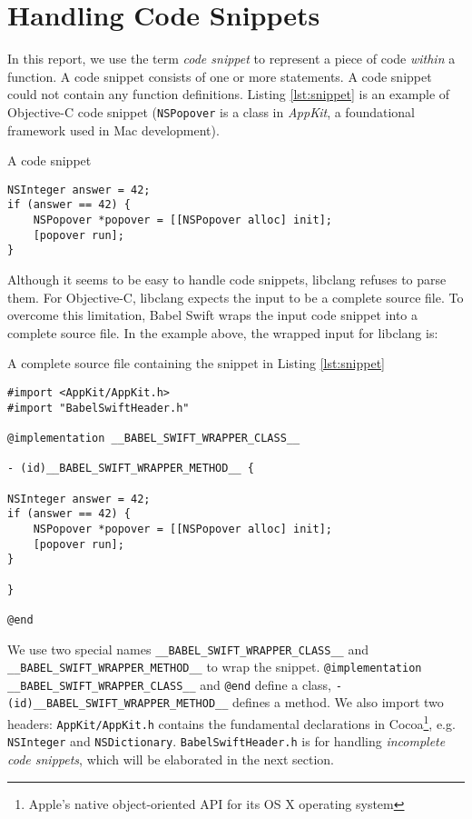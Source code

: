 \documentclass{sfuthesis}
\begin{document}
\section{Handling Code Snippets}

In this report, we use the term \emph{code snippet} to represent a piece of code \emph{within} a function. A code snippet consists of one or more statements. A code snippet could not contain any function definitions. Listing \ref{lst:snippet} is an example of Objective-C code snippet (\texttt{NSPopover} is a class in \emph{AppKit}, a foundational framework used in Mac development).

\begin{listing}
\caption{A code snippet}
\label{lst:snippet}
\begin{verbatim}
NSInteger answer = 42;
if (answer == 42) {
    NSPopover *popover = [[NSPopover alloc] init];
    [popover run];
}
\end{verbatim}
\end{listing}

Although it seems to be easy to handle code snippets, libclang refuses to parse them. For Objective-C, libclang expects the input to be a complete source file. To overcome this limitation, Babel Swift wraps the input code snippet into a complete source file. In the example above, the wrapped input for libclang is:

\begin{listing}
\caption{A complete source file containing the snippet in Listing \ref{lst:snippet}}	
\label{lst:wrappedsnippet}
\begin{verbatim}
#import <AppKit/AppKit.h>
#import "BabelSwiftHeader.h"

@implementation __BABEL_SWIFT_WRAPPER_CLASS__

- (id)__BABEL_SWIFT_WRAPPER_METHOD__ {

NSInteger answer = 42;
if (answer == 42) {
    NSPopover *popover = [[NSPopover alloc] init];
    [popover run];
}

}

@end
\end{verbatim}
\end{listing}

We use two special names \texttt{\_\_BABEL\_SWIFT\_WRAPPER\_CLASS\_\_} and \texttt{\_\_BABEL\_\-SWIFT\_\-WRAPPER\_\-METHOD\_\_} to wrap the snippet. \texttt{@implementation \_\_BABEL\_SWIFT\_\-WRAPPER\_\-CLASS\_\_} and \texttt{@end} define a class, \texttt{- (id)\_\_BABEL\_SWIFT\_WRAPPER\_METHOD\_\_} defines a method. We also import two headers: \texttt{AppKit/AppKit.h} contains the fundamental declarations in Cocoa\footnote{Apple's native object-oriented API for its OS X operating system}, e.g. \texttt{NSInteger} and \texttt{NSDictionary}. \texttt{BabelSwiftHeader.h} is for handling \emph{incomplete code snippets}, which will be elaborated in the next section.
\end{document}
